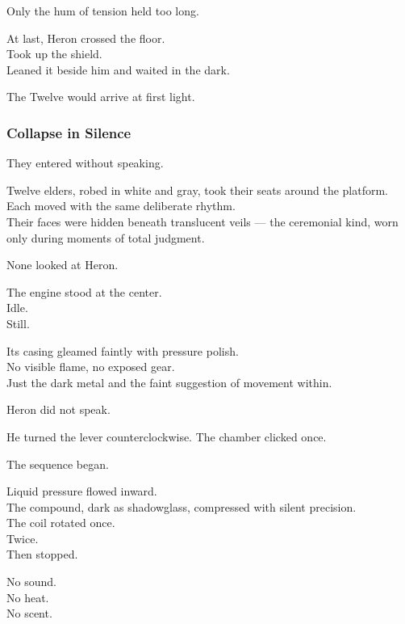\documentclass[12pt]{article}
\begin{document}
Only the hum of tension held too long.

\vspace{1em}

At last, Heron crossed the floor.\\
Took up the shield.\\
Leaned it beside him and waited in the dark.

\vspace{1em}

The Twelve would arrive at first light.

\dotfill

\subsubsection*{Collapse in Silence}

They entered without speaking.

Twelve elders, robed in white and gray, took their seats around the platform.\\
Each moved with the same deliberate rhythm.\\
Their faces were hidden beneath translucent veils — the ceremonial kind, worn only during moments of total judgment.

None looked at Heron.

The engine stood at the center.\\
Idle.\\
Still.

Its casing gleamed faintly with pressure polish.\\
No visible flame, no exposed gear.\\
Just the dark metal and the faint suggestion of movement within.

Heron did not speak.

He turned the lever counterclockwise.  
The chamber clicked once.

\vspace{1em}

The sequence began.

Liquid pressure flowed inward.\\
The compound, dark as shadowglass, compressed with silent precision.\\
The coil rotated once.\\
Twice.\\
Then stopped.

No sound.\\
No heat.\\
No scent.
\end{document}

